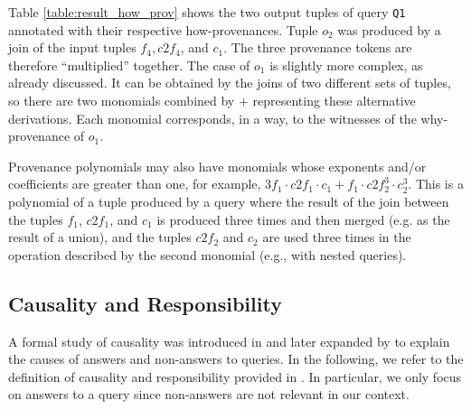 \documentclass[preprint,12pt,sort&compress]{elsarticle}
\newcommand{\scream}[1]{{\bf * #1 *}{\typeout{#1}}}
\begin{document}
Table \ref{table:result_how_prov} shows the two output tuples of query \texttt{Q1} annotated with their respective how-provenances. 
Tuple $o_2$ was produced by a join of the input tuples $f_4, c2f_4$, and $c_1$. The three provenance tokens are therefore  ``multiplied'' together. 
The case of $o_1$ is slightly more complex, as already discussed.
It can be obtained by the joins of two different sets of tuples, so there are two monomials combined by $+$ representing these alternative derivations. Each monomial corresponds, in a way, to the witnesses of the why-provenance of $o_1$.

Provenance polynomials may also have monomials whose exponents and/or coefficients are greater than one, for example, $3f_1 \cdot c2f_1 \cdot c_1 + f_1 \cdot c2f_2^3 \cdot c_2^3$. This is a polynomial of a tuple produced by a query where the result of the join between the tuples $f_1$, $c2f_1$, and $c_1$ is produced three times and then merged (e.g. as the result of a union), and the tuples $c2f_2$ and $c_2$ are used three times in the operation described by the second monomial (e.g., with nested queries). 

\subsection{Causality and Responsibility}
\label{sec:responsibility}

A formal study of causality was introduced in \cite{Halpern2013Causality,ChocklerH04} and later expanded by \citet{MeliouGMS11} to explain the causes of answers and non-answers to queries. 
In the following, we refer to the definition of causality and responsibility provided in \cite{MeliouGMS11}. 
In particular, we only focus on answers to a query since non-answers are not relevant in our context.
\end{document}

